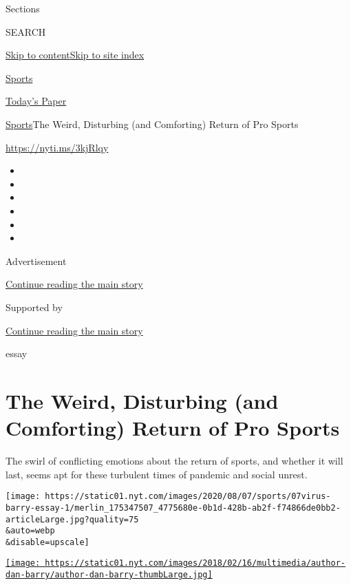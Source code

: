 Sections

SEARCH

\protect\hyperlink{site-content}{Skip to
content}\protect\hyperlink{site-index}{Skip to site index}

\href{https://www.nytimes.com/section/sports}{Sports}

\href{https://myaccount.nytimes.com/auth/login?response_type=cookie\&client_id=vi}{}

\href{https://www.nytimes.com/section/todayspaper}{Today's Paper}

\href{/section/sports}{Sports}\textbar{}The Weird, Disturbing (and
Comforting) Return of Pro Sports

\href{https://nyti.ms/3kjRlqy}{https://nyti.ms/3kjRlqy}

\begin{itemize}
\item
\item
\item
\item
\item
\item
\end{itemize}

Advertisement

\protect\hyperlink{after-top}{Continue reading the main story}

Supported by

\protect\hyperlink{after-sponsor}{Continue reading the main story}

essay

\hypertarget{the-weird-disturbing-and-comforting-return-of-pro-sports}{%
\section{The Weird, Disturbing (and Comforting) Return of Pro
Sports}\label{the-weird-disturbing-and-comforting-return-of-pro-sports}}

The swirl of conflicting emotions about the return of sports, and
whether it will last, seems apt for these turbulent times of pandemic
and social unrest.

\texttt{[image: https://static01.nyt.com/images/2020/08/07/sports/07virus-barry-essay-1/merlin\_175347507\_4775680e-0b1d-428b-ab2f-f74866de0bb2-articleLarge.jpg?quality=75\\\&auto=webp\\\&disable=upscale]}

\href{https://www.nytimes.com/by/dan-barry}{\texttt{[image: https://static01.nyt.com/images/2018/02/16/multimedia/author-dan-barry/author-dan-barry-thumbLarge.jpg]}}

